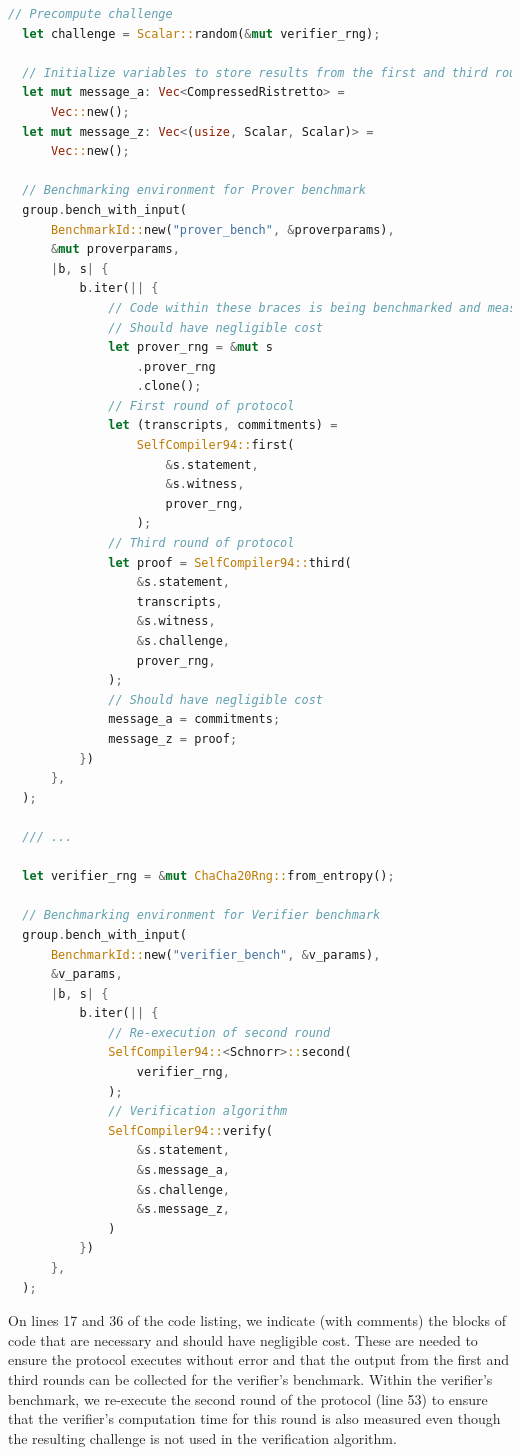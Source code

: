 \begin{lstlisting}[language=rust]
  // Precompute challenge
  let challenge = Scalar::random(&mut verifier_rng);

  // Initialize variables to store results from the first and third round 
  let mut message_a: Vec<CompressedRistretto> =
      Vec::new();
  let mut message_z: Vec<(usize, Scalar, Scalar)> =
      Vec::new();

  // Benchmarking environment for Prover benchmark
  group.bench_with_input(
      BenchmarkId::new("prover_bench", &proverparams),
      &mut proverparams,
      |b, s| {
          b.iter(|| {
              // Code within these braces is being benchmarked and measured
              // Should have negligible cost 
              let prover_rng = &mut s
                  .prover_rng
                  .clone();
              // First round of protocol
              let (transcripts, commitments) =
                  SelfCompiler94::first(
                      &s.statement,
                      &s.witness,
                      prover_rng,
                  );
              // Third round of protocol
              let proof = SelfCompiler94::third(
                  &s.statement,
                  transcripts,
                  &s.witness,
                  &s.challenge,
                  prover_rng,
              );
              // Should have negligible cost
              message_a = commitments;
              message_z = proof;
          })
      },
  );

  /// ...

  let verifier_rng = &mut ChaCha20Rng::from_entropy();

  // Benchmarking environment for Verifier benchmark
  group.bench_with_input(
      BenchmarkId::new("verifier_bench", &v_params),
      &v_params,
      |b, s| {
          b.iter(|| {
              // Re-execution of second round
              SelfCompiler94::<Schnorr>::second(
                  verifier_rng,
              );
              // Verification algorithm
              SelfCompiler94::verify(
                  &s.statement,
                  &s.message_a,
                  &s.challenge,
                  &s.message_z,
              )
          })
      },
  );
\end{lstlisting}

On lines 17 and 36 of the code listing, we indicate (with comments) the blocks 
of code that are necessary and should have negligible cost. These are needed 
to ensure the protocol executes without error and that the output from the 
first and third rounds can be collected for the verifier's benchmark. Within the 
verifier's benchmark, we re-execute the second round of the protocol (line 53) to ensure
that the verifier's computation time for this round is also measured even though 
the resulting challenge is not used in the verification algorithm.

